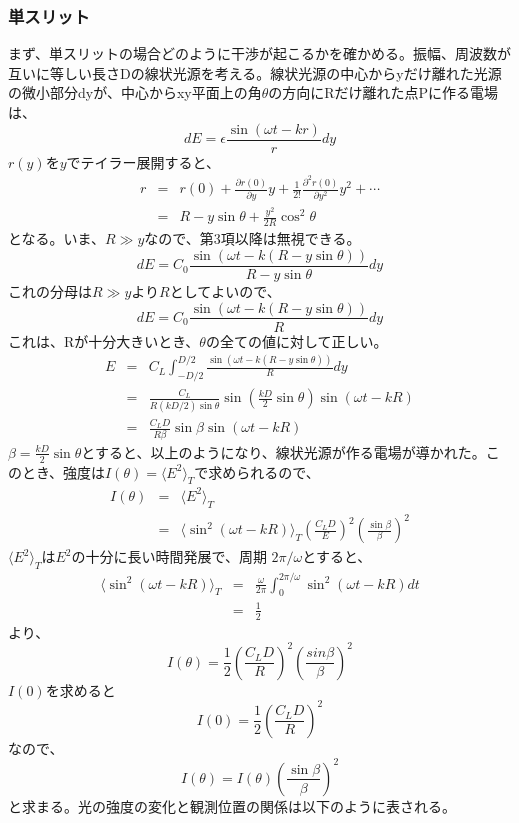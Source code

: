 \documentclass[10pt]{ujarticle}
\begin{document}
\subsubsection{単スリット}
まず、単スリットの場合どのように干渉が起こるかを確かめる。振幅、周波数が互いに等しい長さDの線状光源を考える。線状光源の中心からyだけ離れた光源の微小部分dyが、中心からxy平面上の角$\theta$の方向にRだけ離れた点Pに作る電場は、
\[
dE = \epsilon \frac{\sin(\omega t - kr)}{r} dy
\]
$r(y)$を$y$でテイラー展開すると、
\begin{eqnarray*}
r &=&r(0) + \frac{\partial r(0)}{\partial y} y + \frac{1}{2!} \frac{\partial^2 r(0)}{\partial y^2} y^2 + \cdots \\
&=&R - y\sin\theta + \frac{y^2}{2R} \cos^2 \theta
\end{eqnarray*}
となる。いま、$R \gg y$なので、第3項以降は無視できる。
\[
dE = C_0 \frac{\sin(\omega t -k(R- y\sin \theta ))}{R- y \sin\theta} dy
\]
これの分母は$R \gg y$より$R$としてよいので、
\[
dE = C_0 \frac{\sin(\omega t -k(R- y\sin \theta ))}{R} dy
\]
これは、Rが十分大きいとき、$\theta$の全ての値に対して正しい。
\begin{eqnarray*}
E &=& C_L \int_{-D/2}^{D/2} \frac{\sin(\omega t - k( R - y\sin\theta ))}{R} dy \\
&=& \frac{C_L}{R(kD/2)\sin\theta} \sin\left(\frac{kD}{2} \sin \theta \right) \sin(\omega t -kR) \\
&=& \frac{C_L D}{R\beta} \sin \beta \sin(\omega t - kR)
\end{eqnarray*}
$\beta = \frac{kD}{2} \sin\theta$とすると、以上のようになり、線状光源が作る電場が導かれた。このとき、強度は$I(\theta) = \langle E^2\rangle_T$で求められるので、
\begin{eqnarray*}
I(\theta) &=& \langle E^2 \rangle_T\\
&=& \langle \sin^2(\omega t - kR)\rangle_T \left(\frac{C_L D}{E}\right)^2 \left(\frac{\sin\beta}{\beta}\right)^2
\end{eqnarray*}
$\langle E^2\rangle_T$は$E^2$の十分に長い時間発展で、周期 $2\pi / \omega$とすると、
\begin{eqnarray*}
 \langle \sin^2(\omega t - kR)\rangle_T  &=& \frac{\omega}{2\pi} \int_{0}^{2\pi / \omega} \sin^2(\omega t - kR) dt \\
 &=& \frac{1}{2} 
 \end{eqnarray*}
 より、
\[
I(\theta) = \frac{1}{2} \left(\frac{C_L D}{R}\right)^2 \left(\frac{sin \beta}{\beta}\right)^2
\]
$I(0)$を求めると
\[
I(0) = \frac{1}{2} \left(\frac{C_L D}{R}\right)^2
\]
なので、
\[
I(\theta) = I(\theta) \left(\frac{\sin \beta}{\beta}\right)^2
\]
と求まる。光の強度の変化と観測位置の関係は以下のように表される。\\
\end{document}
